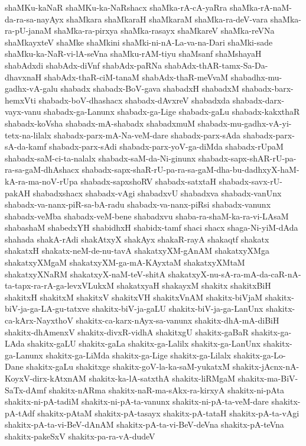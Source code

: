 {shaMKu-kaNaR
shaMKu-ka-NaRshacx
shaMka-rA-cA-yaRra
shaMka-rA-naM-da-ra-sa-nayAyx
shaMkara
shaMkaraH
shaMkaraM
shaMka-ra-deV-vara
shaMka-ra-pU-janaM
shaMka-ra-pirxya
shaMka-rasayx
shaMkareV
shaMka-reVNa
shaMkayxteV
shaMke
shaMkini
shaMki-ni-nA-La-va-na-Dari
shaMki-sade
shaMku-ka-NaR-vi-lA-seVna
shaMku-rAM-tiyu
shaMsanf
shaMshayaH
shabAdxdi
shabAdx-diVnf
shabAdx-paRNa
shabAdx-thAR-tamx-Sa-Da-dhavxnaH
shabAdx-thaR-ciM-tanaM
shabAdx-thaR-meVvaM
shabadhx-mu-gadhx-vA-galu
shabadx
shabadx-BoV-gava
shabadxH
shabadxM
shabadx-barx-hemxVti
shabadx-boV-dhashacx
shabadx-dAvxreV
shabadxda
shabadx-darx-vayx-vanu
shabadx-ga-Lanunx
shabadx-ga-Lige
shabadx-gaLu
shabadx-kakxthaR
shabadx-koVsha
shabadx-mA-shabadx
shabadxmuM
shabadx-mu-gadhx-vA-yi-tetx-na-lilalx
shabadx-parx-mA-Na-veM-dare
shabadx-parx-sAda
shabadx-parx-sA-da-kamf
shabadx-parx-sAdi
shabadx-parx-yoV-ga-diMda
shabadx-rUpaM
shabadx-saM-ci-ta-nalalx
shabadx-saM-da-Ni-ginunx
shabadx-sapx-shAR-rU-pa-ra-sa-gaM-dhAshacx
shabadx-sapx-shaR-rU-pa-ra-sa-gaM-dha-bu-dadhxyX-haM-kA-ra-ma-noV-rUpa
shabadx-sapxshoRV
shabadx-satxtaH
shabadx-savx-rU-pakAH
shabadxshacx
shabadx-vAgi
shabadxvU
shabadxva
shabadx-vanUnx
shabadx-va-nanx-piR-sa-bA-radu
shabadx-va-nanx-piRsi
shabadx-vanunx
shabadx-veMba
shabadx-veM-bene
shabadxvu
shaba-ra-shaM-ka-ra-vi-LAsaM
shabashaM
shabedxYH
shabidhxH
shabidx-tamf
shaci
shacx
shaga-Ni-yiM-dAda
shahada
shakA-rAdi
shakAtxyX
shakAyx
shakaR-rayA
shakaqtf
shakatx
shakatxH
shakatx-neM-de-nu-tavA
shakatxyXM-gAnAM
shakatxyXMga
shakatxyXMgaM
shakatxyXM-ga-mA-KAyxtaM
shakatxyXMtaM
shakatxyXNaRM
shakatxyX-naM-teV-shitA
shakatxyX-nu-sA-ra-mA-da-caR-nA-ta-tapx-ra-rA-ga-levxVLukxM
shakatxyaH
shakayxM
shakitx
shakitxBiH
shakitxH
shakitxM
shakitxV
shakitxVH
shakitxVnAM
shakitx-biVjaM
shakitx-biV-ja-ga-LA-gu-tatxve
shakitx-biV-ja-gaLU
shakitx-biV-ja-ga-LanUnx
shakitx-ca-kArx-NayxthoV
shakitx-ca-karx-nAyx-sa-vanunx
shakitx-dhA-mA-diBiH
shakitx-dhAmenxV
shakitx-divxR-vidhA
shakitxgU
shakitx-gaBaR
shakitx-ga-LAda
shakitx-gaLU
shakitx-gaLa
shakitx-ga-Lalilx
shakitx-ga-LanUnx
shakitx-ga-Lanunx
shakitx-ga-LiMda
shakitx-ga-Lige
shakitx-ga-Lilalx
shakitx-ga-Lo-Dane
shakitx-gaLu
shakitxge
shakitx-goV-la-ka-saM-yukatxM
shakitx-jAcnx-nA-KoyxV-dirx-kAtxnAM
shakitx-ka-lA-satxthA
shakitx-liRMgaM
shakitx-ma-BiV-SaTx-dAmf
shakitx-nARma
shakitx-naR-ma-sAkx-ra-kirxyA
shakitx-ni-pAta
shakitx-ni-pA-tadiM
shakitx-ni-pA-ta-vanunx
shakitx-ni-pA-ta-veM-dare
shakitx-pA-tAdf
shakitx-pAtaM
shakitx-pA-tasayx
shakitx-pA-tataH
shakitx-pA-ta-vAgi
shakitx-pA-ta-vi-BeV-dAnAM
shakitx-pA-ta-vi-BeV-deVna
shakitx-pA-teVna
shakitx-pakeSxV
shakitx-pa-ra-vA-dudeV
}
